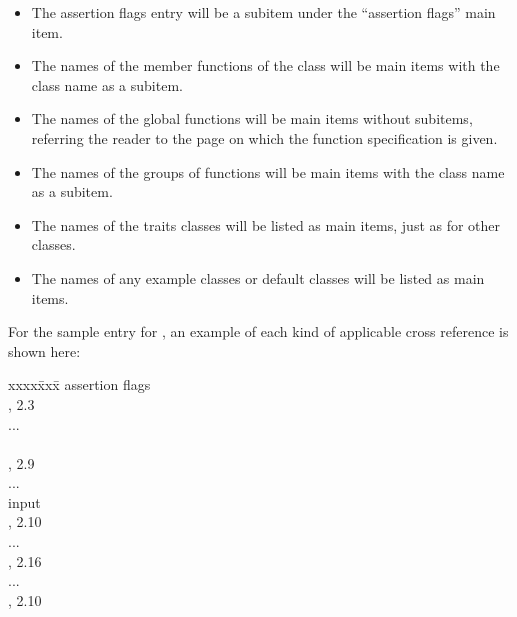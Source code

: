 \documentclass{article}
\newenvironment{indexex}{\begin{tabbing}
xxxx\=xxx\=\kill}{\end{tabbing}}
\begin{document}
\begin{description}
         \begin{itemize}
              \item The assertion flags entry will be a subitem under the
                    ``assertion flags'' main item.
              \item The names of the member functions  of the class
                    will be main items with the class name as a subitem.
              \item The names of the global functions will be main items
                    without subitems, referring the reader to the page on 
                    which the function specification is given.
              \item The names of the groups of functions will be main items
                    with the class name as a subitem.
              \item The names of the traits classes will be listed as
                    main items, just as for other classes. 
              \item The names of any example classes or default classes
                    will be listed as main items.
         \end{itemize}
         For the sample entry for ,
         an example of each kind of applicable cross reference is shown here: 
            \begin{indexex}
            assertion flags                    \\
            \> ,  2.3 \\
            ...                                \\
                                 \\
            \> ,   2.9 \\
            ...                                \\
            input                              \\
            \> ,   2.10 \\
            ...                                \\
            , 2.16 \\
            ...                                      \\
            ,            2.10 \\
            \end{indexex}


\end{description}
\end{document}
